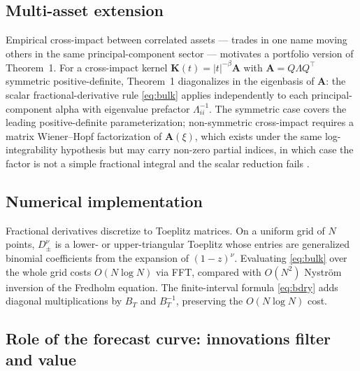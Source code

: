 \documentclass[11pt]{article}
\theoremstyle{plain}
\begin{document}
\subsection{Multi-asset extension}

Empirical cross-impact between correlated assets --- trades in one name moving others in the same principal-component sector --- motivates a portfolio version of Theorem~1. For a cross-impact kernel $\mathbf{K}(t) = |t|^{-\beta}\mathbf{A}$ with $\mathbf{A} = Q\Lambda Q^\top$ symmetric positive-definite, Theorem~1 diagonalizes in the eigenbasis of $\mathbf{A}$: the scalar fractional-derivative rule \eqref{eq:bulk} applies independently to each principal-component alpha with eigenvalue prefactor $\Lambda_{ii}^{-1}$. The symmetric case covers the leading positive-definite parameterization; non-symmetric cross-impact requires a matrix Wiener--Hopf factorization of $\mathbf{A}(\xi)$, which exists under the same log-integrability hypothesis but may carry non-zero partial indices, in which case the factor is not a simple fractional integral and the scalar reduction fails \citep{GohbergKrein1970}.

\subsection{Numerical implementation}

Fractional derivatives discretize to Toeplitz matrices. On a uniform grid of $N$ points, $D_\pm^\nu$ is a lower- or upper-triangular Toeplitz whose entries are generalized binomial coefficients from the expansion of $(1-z)^\nu$. Evaluating \eqref{eq:bulk} over the whole grid costs $O(N\log N)$ via FFT, compared with $O(N^2)$ Nystr\"om inversion of the Fredholm equation. The finite-interval formula \eqref{eq:bdry} adds diagonal multiplications by $B_T$ and $B_T^{-1}$, preserving the $O(N\log N)$ cost.

\subsection{Role of the forecast curve: innovations filter and value}
\end{document}
